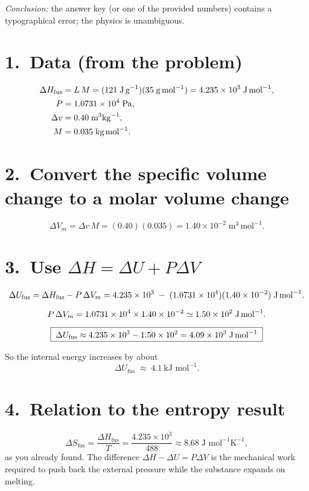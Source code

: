 \documentclass[12pt]{article}
\theoremstyle{definition} %
\theoremstyle{plain} %
\begin{document}
\textit{Conclusion:} the answer key (or one of the provided numbers)
contains a typographical error; the physics is unambiguous.
\section*{1.\  Data (from the problem)}
\[
\begin{aligned}
\Delta H_\text{fus} &= L\,M
                    = (121\;\text{J\,g}^{-1})(35\;\text{g\,mol}^{-1})
                    = 4.235\times10^{3}\;\text{J\,mol}^{-1},\\
P &= 1.0731\times10^{4}\;\text{Pa},\\
\Delta v &= 0.40\;\text{m}^3\!\,\text{kg}^{-1},\\
M &= 0.035\;\text{kg\,mol}^{-1}.
\end{aligned}
\]

\section*{2.\  Convert the specific volume change to a molar volume change}

\[
\boxed{\;
  \Delta V_m
  = \Delta v\,M
  = (0.40)(0.035)
  = 1.40\times10^{-2}\;\text{m}^3\,\text{mol}^{-1}.
\;}
\]

\section*{3.\  Use \(\Delta H = \Delta U + P\Delta V\)}

\[
\Delta U_\text{fus}
  = \Delta H_\text{fus} - P\,\Delta V_m
  = 4.235\times10^{3}
    \;-\;
    (1.0731\times10^{4})(1.40\times10^{-2})
  \;\text{J\,mol}^{-1}.
\]

\[
P\,\Delta V_m
  = 1.0731\times10^{4}\times1.40\times10^{-2}
  \simeq 1.50\times10^{2}\;\text{J\,mol}^{-1}.
\]

\[
\boxed{\;
  \Delta U_\text{fus}
  \approx 4.235\times10^{3} - 1.50\times10^{2}
  = 4.09\times10^{3}\;\text{J\,mol}^{-1}
\;}
\]

So the internal energy increases by about  
\[
\boxed{\; \Delta U_\text{fus}\;\approx\; 4.1\ \text{kJ mol}^{-1}. \;}
\]

\section*{4.\  Relation to the entropy result}

\[
\Delta S_\text{fus} = \frac{\Delta H_\text{fus}}{T}
                    = \frac{4.235\times10^{3}}{488}
                    \approx 8.68\;\text{J mol}^{-1}\text{K}^{-1},
\]
as you already found.  The difference
\(\Delta H - \Delta U = P\Delta V\) is the mechanical work required to
push back the external pressure while the substance expands on melting.
\end{document}
